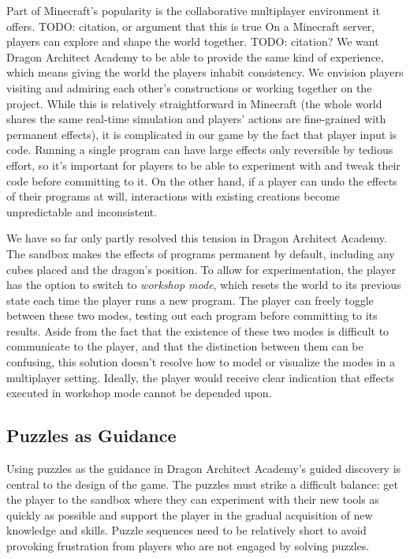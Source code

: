\documentclass{sig-alternate}
\newcommand{\TODO}[1]{{\color{red} TODO: #1}}
\newcommand{\gametitle}{{\color{RoyalPurple} Dragon Architect Academy}}
\begin{document}
Part of Minecraft's popularity is the collaborative multiplayer environment it offers. \TODO{citation, or argument that this is true}
On a Minecraft server, players can explore and shape the world together. \TODO{citation?} 
We want \gametitle{} to be able to provide the same kind of experience, which means giving the world the players inhabit consistency. 
We envision players visiting and admiring each other's constructions or working together on the project. 
While this is relatively straightforward in Minecraft (the whole world shares the same real-time simulation and players' actions are fine-grained with permanent effects), it is complicated in our game by the fact that player input is code. 
Running a single program can have large effects only reversible by tedious effort, so it's important for players to be able to experiment with and tweak their code before committing to it. 
On the other hand, if a player can undo the effects of their programs at will, interactions with existing creations become unpredictable and inconsistent. 

We have so far only partly resolved this tension in \gametitle{}. 
The sandbox makes the effects of programs permanent by default, including any cubes placed and the dragon's position.
To allow for experimentation, the player has the option to switch to \emph{workshop mode}, which resets the world to its previous state each time the player runs a new program. 
The player can freely toggle between these two modes, testing out each program before committing to its results. 
Aside from the fact that the existence of these two modes is difficult to communicate to the player, and that the distinction between them can be confusing, this solution doesn't resolve how to model or visualize the modes in a multiplayer setting. 
Ideally, the player would receive clear indication that effects executed in workshop mode cannot be depended upon.

\subsection{Puzzles as Guidance}
\label{sec:direct_guidance}

Using puzzles as the guidance in \gametitle{}'s guided discovery is central to the design of the game. 
The puzzles must strike a difficult balance: get the player to the sandbox where they can experiment with their new tools as quickly as possible and support the player in the gradual acquisition of new knowledge and skills. 
Puzzle sequences need to be relatively short to avoid provoking frustration from players who are not engaged by solving puzzles. 
\end{document}
